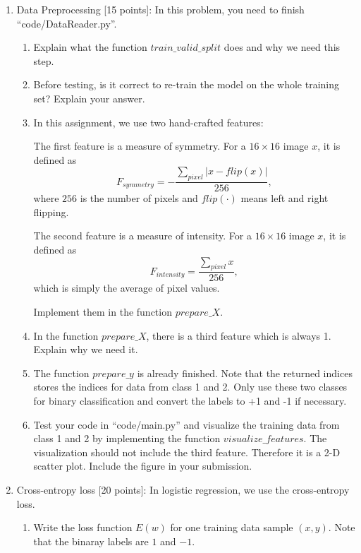 \documentclass[11pt]{article}
\begin{document}
\begin{enumerate}

    \item Data Preprocessing [15 points]: In this problem, you need to finish ``code/DataReader.py''.
    \begin{enumerate}
        \item Explain what the function $train\_valid\_split$ does and why we need this step.

        \item Before testing, is it correct to re-train the model on the whole training set? Explain your answer.

        \item In this assignment, we use two hand-crafted features:

        The first feature is a measure of symmetry. For a $16 \times 16$ image $x$, it is defined as
        $$F_{symmetry} = -\frac{\sum_{pixel}{|x - flip(x)|}}{256},$$
        where $256$ is the number of pixels and $flip(\cdot)$ means left and right flipping.

        The second feature is a measure of intensity. For a $16 \times 16$ image $x$, it is defined as
        $$F_{intensity} = \frac{\sum_{pixel}{x}}{256},$$
        which is simply the average of pixel values.

        Implement them in the function $prepare\_X$.

        \item In the function $prepare\_X$, there is a third feature which is always 1. Explain why we need it.

        \item The function $prepare\_y$ is already finished. Note that the returned indices stores the indices for data from class 1 and 2. Only use these two classes for binary classification and convert the labels to +1 and -1 if necessary.

        \item Test your code in ``code/main.py'' and visualize the training data from class 1 and 2 by implementing the function $visualize\_features$. The visualization should not include the third feature. Therefore it is a 2-D scatter plot. Include the figure in your submission.
    \end{enumerate}


    \item Cross-entropy loss [20 points]: In logistic regression, we use the cross-entropy loss.
    \begin{enumerate}
        \item Write the loss function $E(w)$ for one training data sample $(x, y)$. Note that the binaray labels are $1$ and $-1$.


\end{enumerate}
\end{enumerate}
\end{document}

